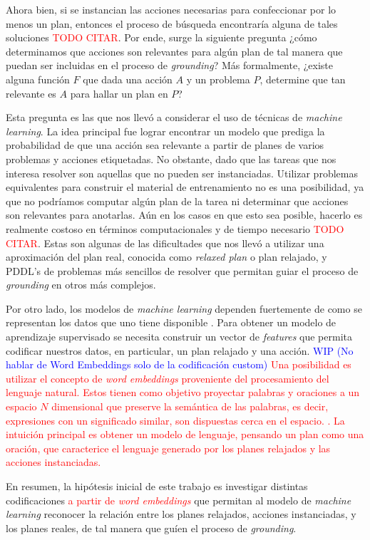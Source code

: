Ahora bien, si se instancian las acciones necesarias para confeccionar por lo
menos un plan, entonces el proceso de búsqueda encontraría alguna de tales
soluciones \textcolor{red}{TODO CITAR}. Por ende, surge la siguiente pregunta
¿cómo determinamos que acciones son relevantes para algún plan de tal manera que
puedan ser incluidas en el proceso de \emph{grounding}? Más formalmente, ¿existe
alguna función $F$ que dada una acción $A$ y un problema $P$, determine que tan
relevante es $A$ para hallar un plan en $P$?

Esta pregunta es las que nos llevó a considerar el uso de técnicas de
\emph{machine learning}. La idea principal fue lograr encontrar un modelo que
prediga la probabilidad de que una acción sea relevante a partir de planes de
varios problemas y acciones etiquetadas. No obstante, dado que las tareas que
nos interesa resolver son aquellas que no pueden ser instanciadas. Utilizar
problemas equivalentes para construir el material de entrenamiento no es una
posibilidad, ya que no podríamos computar algún plan de la tarea ni determinar
que acciones son relevantes para anotarlas. Aún en los casos en que esto sea
posible, hacerlo es realmente costoso en términos computacionales y de tiempo
necesario \textcolor{red}{TODO CITAR}. Estas son algunas de las dificultades que
nos llevó a utilizar una aproximación del plan real, conocida como \emph{relaxed
plan} o plan relajado, y PDDL's de problemas más sencillos de resolver que
permitan guiar el proceso de \emph{grounding} en otros más complejos.

Por otro lado, los modelos de \emph{machine learning} dependen fuertemente de
como se representan los datos que uno tiene disponible \citep{Heaton-2016-AnEA}.
Para obtener un modelo de aprendizaje supervisado se necesita construir un
vector de \emph{features} que permita codificar nuestros datos, en particular,
un plan relajado y una acción. \textcolor{blue}{WIP (No hablar de Word
Embeddings solo de la codificación custom)} \textcolor{red}{Una posibilidad es
utilizar el concepto de \emph{word embeddings} proveniente del procesamiento del
lenguaje natural. Estos tienen como objetivo proyectar palabras y oraciones a un
espacio $N$ dimensional que preserve la semántica de las palabras, es decir,
expresiones con un significado similar, son dispuestas cerca en el espacio.
\citep{Mikolov-Ilya-Kai-Greg-Jeffrey-2013,
Pennington-Jeffrey-Socher-Richard-Manning-Christopher-2014,
Bojanowski-Grave-Joulin-Mikolov-2016}. La intuición principal es obtener un
modelo de lenguaje, pensando un plan como una oración, que caracterice el
lenguaje generado por los planes relajados y las acciones instanciadas.}

En resumen, la hipótesis inicial de este trabajo es investigar distintas
codificaciones \textcolor{red}{a partir de \emph{word embeddings}} que permitan
al modelo de \emph{machine learning} reconocer la relación entre los planes
relajados, acciones instanciadas, y los planes reales, de tal manera que guíen
el proceso de \emph{grounding}.